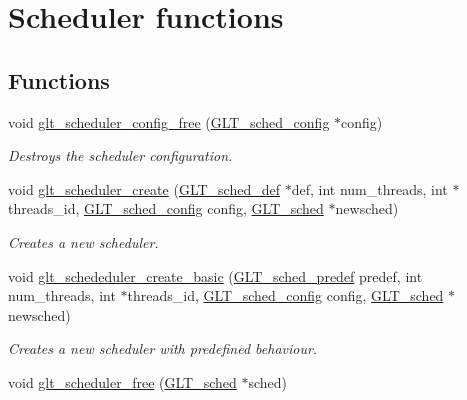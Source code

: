 \hypertarget{group__SCHED}{\section{Scheduler functions}
\label{group__SCHED}
}
\subsection*{Functions}
\begin{DoxyCompactItemize}
\item 
void \hyperlink{group__SCHED_ga76838701f9ab543f1b68660bb9544bdb}{glt\-\_\-scheduler\-\_\-config\-\_\-free} (\hyperlink{group__OBJECTS_gab393527352365f0881587bfa6fe7bd58}{G\-L\-T\-\_\-sched\-\_\-config} $\ast$config)
\begin{DoxyCompactList}\small\item\em Destroys the scheduler configuration. \end{DoxyCompactList}\item 
void \hyperlink{group__SCHED_gade3126dca3b35d86917dbab513e9b198}{glt\-\_\-scheduler\-\_\-create} (\hyperlink{group__OBJECTS_ga75b80f18f714c964bef84c3f420569ca}{G\-L\-T\-\_\-sched\-\_\-def} $\ast$def, int num\-\_\-threads, int $\ast$threads\-\_\-id, \hyperlink{group__OBJECTS_gab393527352365f0881587bfa6fe7bd58}{G\-L\-T\-\_\-sched\-\_\-config} config, \hyperlink{group__OBJECTS_gab02c120fc3e930ea3d1da65a21eaa6d6}{G\-L\-T\-\_\-sched} $\ast$newsched)
\begin{DoxyCompactList}\small\item\em Creates a new scheduler. \end{DoxyCompactList}\item 
void \hyperlink{group__SCHED_gaeae5db1ee6507774e5aa31244de9b820}{glt\-\_\-schededuler\-\_\-create\-\_\-basic} (\hyperlink{group__OBJECTS_ga097f915ddbfeb042981472405836633f}{G\-L\-T\-\_\-sched\-\_\-predef} predef, int num\-\_\-threads, int $\ast$threads\-\_\-id, \hyperlink{group__OBJECTS_gab393527352365f0881587bfa6fe7bd58}{G\-L\-T\-\_\-sched\-\_\-config} config, \hyperlink{group__OBJECTS_gab02c120fc3e930ea3d1da65a21eaa6d6}{G\-L\-T\-\_\-sched} $\ast$newsched)
\begin{DoxyCompactList}\small\item\em Creates a new scheduler with predefined behaviour. \end{DoxyCompactList}\item 
void \hyperlink{group__SCHED_ga35f2b8129d924c1b53f8ffe5d36a895c}{glt\-\_\-scheduler\-\_\-free} (\hyperlink{group__OBJECTS_gab02c120fc3e930ea3d1da65a21eaa6d6}{G\-L\-T\-\_\-sched} $\ast$sched)

\end{DoxyCompactItemize}
